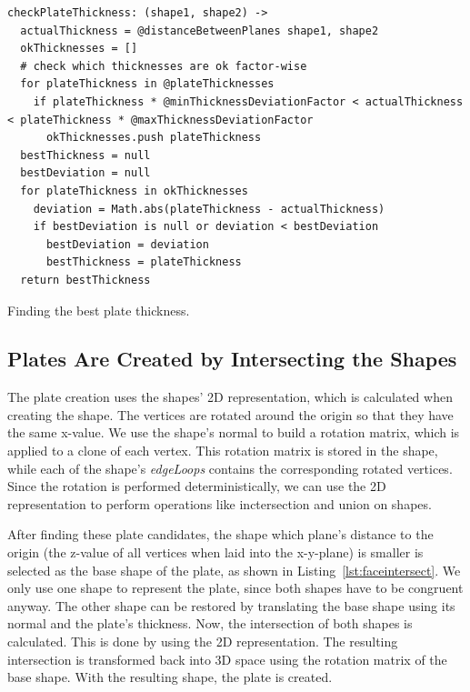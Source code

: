 \documentclass[../ClassicThesis.tex]{subfiles}
\begin{document}
\begin{listing}
\begin{verbatim}
checkPlateThickness: (shape1, shape2) ->
  actualThickness = @distanceBetweenPlanes shape1, shape2
  okThicknesses = []
  # check which thicknesses are ok factor-wise
  for plateThickness in @plateThicknesses
    if plateThickness * @minThicknessDeviationFactor < actualThickness < plateThickness * @maxThicknessDeviationFactor
      okThicknesses.push plateThickness
  bestThickness = null
  bestDeviation = null
  for plateThickness in okThicknesses
    deviation = Math.abs(plateThickness - actualThickness)
    if bestDeviation is null or deviation < bestDeviation
      bestDeviation = deviation
      bestThickness = plateThickness
  return bestThickness
\end{verbatim}
\caption{Finding the best plate thickness.}
\label{lst:checkplatethickness}
\end{listing}

\subsection{Plates Are Created by Intersecting the Shapes}

The plate creation uses the shapes' 2D representation, which is calculated when creating the shape. The vertices are rotated around the origin so that they have the same x-value. We use the shape's normal to build a rotation matrix, which is applied to a clone of each vertex. This rotation matrix is stored in the shape, while each of the shape's \emph{edgeLoops} contains the corresponding rotated vertices. Since the rotation is performed deterministically, we can use the 2D representation to perform operations like inctersection and union on shapes.

After finding these plate candidates, the shape which plane's distance to the origin (the z-value of all vertices when laid into the x-y-plane) is smaller is selected as the base shape of the plate, as shown in Listing~\ref{lst:faceintersect}. We only use one shape to represent the plate, since both shapes have to be congruent anyway. The other shape can be restored by translating the base shape using its normal and the plate's thickness. Now, the intersection of both shapes is calculated. This is done by using the 2D representation. The resulting intersection is transformed back into 3D space using the rotation matrix of the base shape. With the resulting shape, the plate is created.
\end{document}
